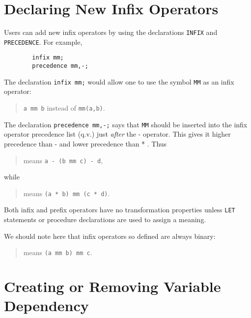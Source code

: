 \section{Declaring New Infix Operators}

Users can add new infix operators by using the declarations
{\tt INFIX}  and {\tt PRECEDENCE}. 
For example,
\begin{verbatim}
        infix mm;
        precedence mm,-;
\end{verbatim}
The declaration {\tt infix mm;} would allow one to use the symbol
{\tt MM} as an infix operator:
\begin{quote}
\hspace{0.2in} {\tt a mm b} \hspace{0.3in} instead of \hspace{0.3in}
{\tt mm(a,b)}.
\end{quote}

The declaration {\tt precedence mm,-;} says that {\tt MM} should be
inserted into the infix operator precedence list (q.v.) just {\em after}
the - operator.  This gives it higher precedence than - and lower
precedence than * .  Thus

\begin{quote}
\hspace{0.2in}{\tt a - b mm c - d}\hspace{.3in} means \hspace{.3in}
{\tt a - (b mm c) - d},
\end{quote}
while
\begin{quote}
\hspace{0.2in}{\tt   a * b mm c * d}\hspace{.3in} means \hspace{.3in}
{\tt (a * b) mm (c * d)}.
\end{quote}

Both infix and prefix operators have no transformation
properties unless {\tt LET}  statements or procedure
declarations are used to assign a meaning.

We should note here that infix operators so defined are always binary:
\begin{quote}
\hspace{0.2in}{\tt a mm b mm c}\hspace{.3in} means \hspace{.3in}
{\tt (a mm b) mm c}.
\end{quote}

\section{Creating or Removing Variable Dependency}

